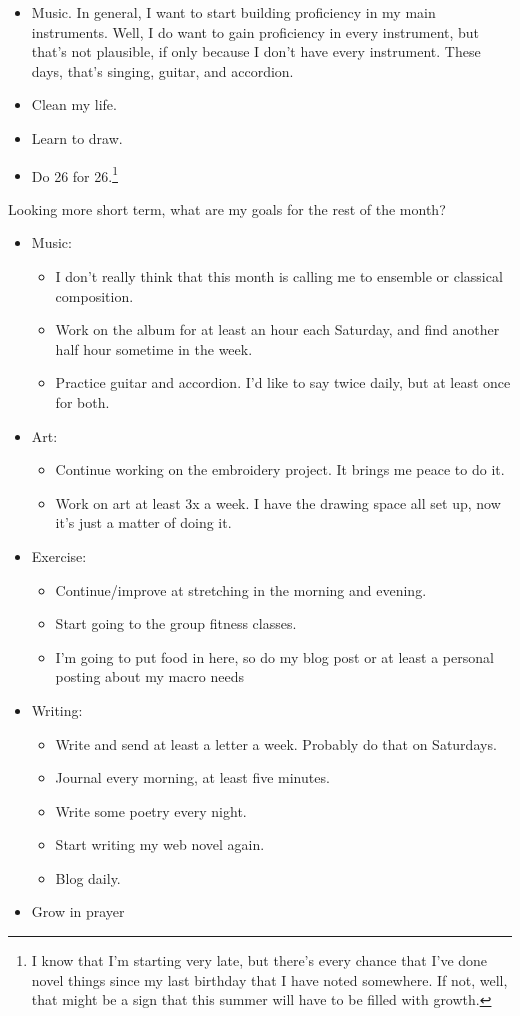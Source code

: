 \documentclass[12pt]{article}[titlepage]
\renewcommand{\,}{\textsuperscript{,}}
\begin{document}
\begin{itemize}
\item Music. In general, I want to start building proficiency in my main instruments. Well, I do want to gain proficiency in every instrument, but that's not plausible, if only because I don't have every instrument. These days, that's singing, guitar, and accordion.  
\item Clean my life.  
\item Learn to draw.  
\item Do 26 for 26.\footnote{I know that I'm starting very late, but there's every chance that I've done novel things since my last birthday that I have noted somewhere. If not, well, that might be a sign that this summer will have to be filled with growth.}  
\end{itemize}

Looking more short term, what are my goals for the rest of the month?

\begin{itemize}  
\item Music:  
\begin{itemize}  
\item I don't really think that this month is calling me to ensemble or classical composition.  
\item Work on the album for at least an hour each Saturday, and find another half hour sometime in the week.  
\item Practice guitar and accordion. I'd like to say twice daily, but at least once for both.  
\end{itemize}  
\item Art:  
\begin{itemize}  
\item Continue working on the embroidery project. It brings me peace to do it.  
\item Work on art at least 3x a week. I have the drawing space all set up, now it's just a matter of doing it.  
\end{itemize}  
\item Exercise:  
\begin{itemize}  
\item Continue/improve at stretching in the morning and evening.  
\item Start going to the group fitness classes.  
\item I'm going to put food in here, so do my blog post or at least a personal posting about my macro needs  
\end{itemize}  
\item Writing:  
\begin{itemize}  
\item Write and send at least a letter a week. Probably do that on Saturdays.  
\item Journal every morning, at least five minutes.  
\item Write some poetry every night.  
\item Start writing my web novel again.  
\item Blog daily.  
\end{itemize}  
\item Grow in prayer  
\end{itemize}
\end{document}
